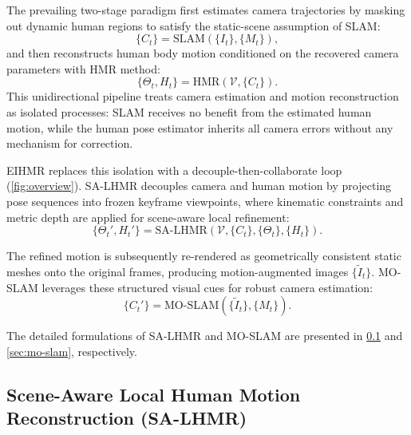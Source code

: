 \documentclass[runningheads]{llncs}
\begin{document}
The prevailing two-stage paradigm first estimates camera trajectories by masking out dynamic human regions to satisfy the static-scene assumption of SLAM:
%
\begin{equation}
  \{C_t\} = \text{SLAM}(\{I_t\}, \{M_t\}),
\end{equation}
%
and then reconstructs human body motion conditioned on the recovered camera parameters with HMR method:
%
\begin{equation}
  \{\Theta_t, H_t\} = \text{HMR}(\mathcal{V}, \{C_t\}).
\end{equation}
%
This unidirectional pipeline treats camera estimation and motion reconstruction as isolated processes: SLAM receives no benefit from the estimated human motion, while the human pose estimator inherits all camera errors without any mechanism for correction.

EIHMR replaces this isolation with a decouple-then-collaborate loop (\cref{fig:overview}). SA-LHMR decouples camera and human motion by projecting pose sequences into frozen keyframe viewpoints, where kinematic constraints and metric depth are applied for scene-aware local refinement:
%
\begin{equation}
  \{\Theta_t', H_t'\} = \text{SA-LHMR}\left(\mathcal{V}, \{C_t\}, \{\Theta_t\}, \{H_t\}\right).
\end{equation}

The refined motion is subsequently re-rendered as geometrically consistent static meshes onto the original frames, producing motion-augmented images $\{\tilde{I}_t\}$. MO-SLAM leverages these structured visual cues for robust camera estimation:
%
\begin{equation}
  \{C_t'\} = \text{MO-SLAM}\left(\{\tilde{I}_t\}, \{M_t\}\right).
\end{equation}

The detailed formulations of SA-LHMR and MO-SLAM are presented in \cref{sec:sa-lhmr} and \cref{sec:mo-slam}, respectively.



\subsection{Scene-Aware Local Human Motion Reconstruction (SA-LHMR)}
\label{sec:sa-lhmr}
\end{document}
